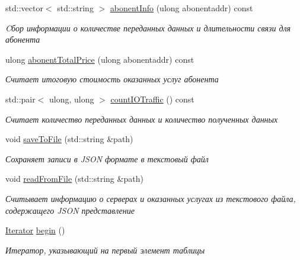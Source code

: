 \begin{DoxyCompactItemize}
std\+::vector$<$ std\+::string $>$ \hyperlink{class_network_service_1_1_application_a0b064e8f7ab3a8932a610f53713e12ab}{abonent\+Info} (ulong abonentaddr) const 
\begin{DoxyCompactList}\small\item\em Cбор информации о количестве переданных данных и длительности связи для абонента \end{DoxyCompactList}\item 
ulong \hyperlink{class_network_service_1_1_application_ab44d0123e96ef44496aab54effc42281}{abonent\+Total\+Price} (ulong abonentaddr) const 
\begin{DoxyCompactList}\small\item\em Считает итоговую стоимость оказанных услуг абонента \end{DoxyCompactList}\item 
std\+::pair$<$ ulong, ulong $>$ \hyperlink{class_network_service_1_1_application_a52c98b58888cda1930b1d88d99ab7af7}{count\+I\+O\+Traffic} () const 
\begin{DoxyCompactList}\small\item\em Считает количество переданных данных и количество полученных данных \end{DoxyCompactList}\item 
void \hyperlink{class_network_service_1_1_application_a670578bac65348d3c604fdf53585102b}{save\+To\+File} (std\+::string \&path)
\begin{DoxyCompactList}\small\item\em Сохраняет записи в J\+S\+O\+N формате в текстовый файл \end{DoxyCompactList}\item 
void \hyperlink{class_network_service_1_1_application_ab86f830805a3b9ab2909ea65f7eb48b8}{read\+From\+File} (std\+::string \&path)
\begin{DoxyCompactList}\small\item\em Считывает информацию о серверах и оказанных услугах из текстового файла, содержащего J\+S\+O\+N представление \end{DoxyCompactList}\item 
\hyperlink{class_network_service_1_1_application_a206937019d86d3391a209e9883b44f7b}{Iterator} \hyperlink{class_network_service_1_1_application_af79bea7489f0192a631af1477290af14}{begin} ()
\begin{DoxyCompactList}\small\item\em Итератор, указывающий на первый элемент таблицы \end{DoxyCompactList}\item 

\end{DoxyCompactItemize}
